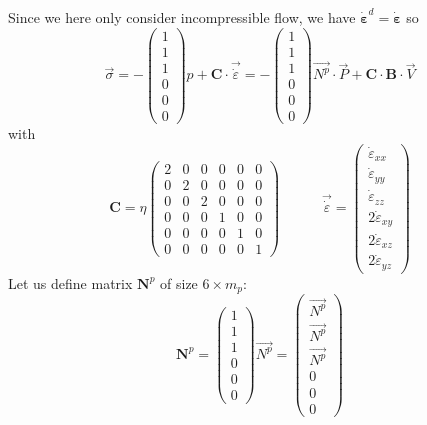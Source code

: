 Since we here only consider incompressible flow, we have $\dot{\bm \varepsilon}^d=\dot{\bm \varepsilon}$
so
\begin{equation}
\vec{\sigma} 
=-\left( 
\begin{array}{c}
1 \\ 1 \\ 1 \\ 0 \\ 0 \\ 0
\end{array}
\right) p+ {\bm C} \cdot \vec{\dot\varepsilon}
=
- \left(
\begin{array}{c}
1 \\ 1 \\ 1 \\ 0 \\ 0 \\ 0
\end{array}
\right)
\vec{N^p} \cdot {\vec P}  + 
{\bm C} \cdot  {\bm B}\cdot {\vec V}
\end{equation}
with
\begin{equation}
{\bm C}=
\eta
\left(
\begin{array}{cccccc}
2 & 0 & 0 & 0 & 0 & 0\\
0 & 2 & 0 & 0 & 0 & 0\\
0 & 0 & 2 & 0 & 0 & 0\\ 
0 & 0 & 0 & 1 & 0 & 0\\ 
0 & 0 & 0 & 0 & 1 & 0\\ 
0 & 0 & 0 & 0 & 0 & 1
\end{array}
\right)
\quad\quad\quad
\vec{\dot \varepsilon} = 
\left(
\begin{array}{c}
\dot \varepsilon_{xx} \\
\dot \varepsilon_{yy} \\
\dot \varepsilon_{zz} \\
2\dot \varepsilon_{xy}\\ 
2\dot \varepsilon_{xz} \\
2\dot \varepsilon_{yz} 
\end{array}
\right)
\end{equation}
Let us define matrix ${\bm N}^p$ of size $6\times m_p$:
\begin{equation}
{\bm N}^p=
\left(
\begin{array}{c}
1 \\ 1 \\ 1 \\ 0 \\ 0 \\ 0
\end{array}
\right)
\vec{N^p} 
=
\left(
\begin{array}{c}
\vec{N^p} \\
\vec{N^p} \\
\vec{N^p} \\
0 \\
0 \\
0
\end{array}
\right)
\end{equation}
